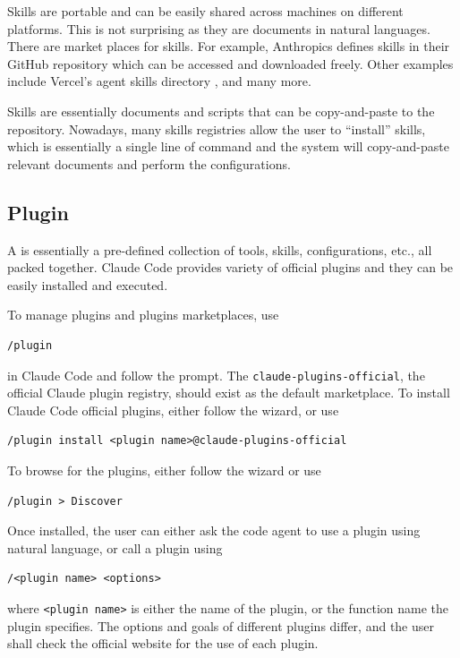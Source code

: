 Skills are portable and can be easily shared across machines on different platforms. This is not surprising as they are documents in natural languages. There are market places for skills. For example, Anthropics defines skills in their GitHub repository \cite{anthropic2026skills} which can be accessed and downloaded freely. Other examples include Vercel's agent skills directory \cite{vercel2026skills}, and many more.

Skills are essentially documents and scripts that can be copy-and-paste to the repository. Nowadays, many skills registries allow the user to ``install'' skills, which is essentially a single line of command and the system will copy-and-paste relevant documents and perform the configurations.

\subsection{Plugin}

A  is essentially a pre-defined collection of tools, skills, configurations, etc., all packed together. Claude Code provides variety of official plugins and they can be easily installed and executed.

To manage plugins and plugins marketplaces, use
\begin{lstlisting}
/plugin
\end{lstlisting}
in Claude Code and follow the prompt. The \texttt{claude-plugins-official}, the official Claude plugin registry, should exist as the default marketplace. To install Claude Code official plugins, either follow the wizard, or use
\begin{lstlisting}
/plugin install <plugin name>@claude-plugins-official
\end{lstlisting}
To browse for the plugins, either follow the wizard or use
\begin{lstlisting}
/plugin > Discover
\end{lstlisting}

Once installed, the user can either ask the code agent to use a plugin using natural language, or call a plugin using
\begin{lstlisting}
/<plugin name> <options>
\end{lstlisting}
where \verb|<plugin name>| is either the name of the plugin, or the function name the plugin specifies. The options and goals of different plugins differ, and the user shall check the official website for the use of each plugin. 

